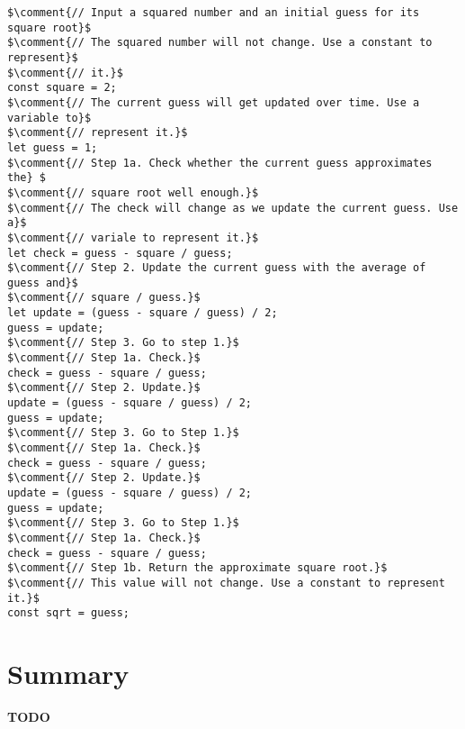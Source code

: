 \begin{lstlisting}[escapeinside=$$]
$\comment{// Input a squared number and an initial guess for its square root}$
$\comment{// The squared number will not change. Use a constant to represent}$
$\comment{// it.}$
const square = 2;
$\comment{// The current guess will get updated over time. Use a variable to}$
$\comment{// represent it.}$
let guess = 1;
$\comment{// Step 1a. Check whether the current guess approximates the} $
$\comment{// square root well enough.}$
$\comment{// The check will change as we update the current guess. Use a}$
$\comment{// variale to represent it.}$
let check = guess - square / guess;
$\comment{// Step 2. Update the current guess with the average of guess and}$
$\comment{// square / guess.}$
let update = (guess - square / guess) / 2;
guess = update;
$\comment{// Step 3. Go to step 1.}$
$\comment{// Step 1a. Check.}$
check = guess - square / guess;
$\comment{// Step 2. Update.}$
update = (guess - square / guess) / 2;
guess = update;
$\comment{// Step 3. Go to Step 1.}$
$\comment{// Step 1a. Check.}$
check = guess - square / guess;
$\comment{// Step 2. Update.}$
update = (guess - square / guess) / 2;
guess = update;
$\comment{// Step 3. Go to Step 1.}$
$\comment{// Step 1a. Check.}$
check = guess - square / guess;
$\comment{// Step 1b. Return the approximate square root.}$
$\comment{// This value will not change. Use a constant to represent it.}$
const sqrt = guess;
\end{lstlisting}

\section{Summary}
\textbf{TODO}
